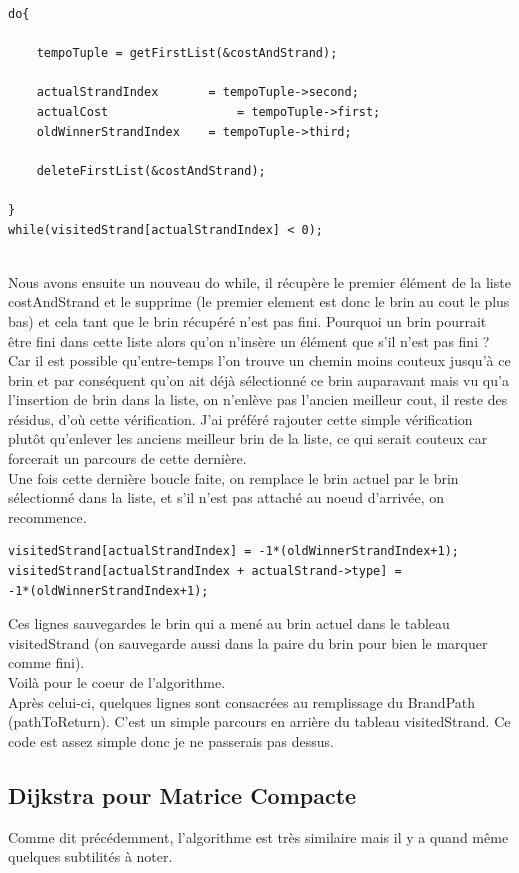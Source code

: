 \documentclass[11pt]{article}
\begin{document}
\begin{lstlisting}
do{

    tempoTuple = getFirstList(&costAndStrand);
    
    actualStrandIndex 		= tempoTuple->second;
    actualCost                  = tempoTuple->first;
    oldWinnerStrandIndex 	= tempoTuple->third;
    
    deleteFirstList(&costAndStrand);

}
while(visitedStrand[actualStrandIndex] < 0);
\end{lstlisting}\\
Nous avons ensuite un nouveau do while, il récupère le premier élément de la liste costAndStrand et le supprime (le premier element est donc le brin au cout le plus bas) et cela tant que le brin récupéré n'est pas fini. Pourquoi un brin pourrait être fini dans cette liste alors qu'on n'insère un élément que s'il n'est pas fini ? Car il est possible qu'entre-temps l'on trouve un chemin moins couteux jusqu'à ce brin et par conséquent qu'on ait déjà sélectionné ce brin auparavant mais vu qu'a l'insertion de brin dans la liste, on n'enlève pas l'ancien meilleur cout, il reste des résidus, d'où cette vérification. J'ai préféré rajouter cette simple vérification plutôt qu'enlever les anciens meilleur brin de la liste, ce qui serait couteux car forcerait un parcours de cette dernière.\newline
\\
Une fois cette dernière boucle faite, on remplace le brin actuel par le brin sélectionné dans la liste, et s'il n'est pas attaché au noeud d'arrivée, on recommence.\\


\begin{lstlisting}
visitedStrand[actualStrandIndex] = -1*(oldWinnerStrandIndex+1);
visitedStrand[actualStrandIndex + actualStrand->type] =
-1*(oldWinnerStrandIndex+1);
\end{lstlisting}

Ces lignes sauvegardes le brin qui a mené au brin actuel dans le tableau visitedStrand (on sauvegarde aussi dans la paire du brin pour bien le marquer comme fini).\\
Voilà pour le coeur de l'algorithme.\\
Après celui-ci, quelques lignes sont consacrées au remplissage du BrandPath (pathToReturn). C'est un simple parcours en arrière du tableau visitedStrand. Ce code est assez simple donc je ne passerais pas dessus.\\
\subsection{Dijkstra pour Matrice Compacte}
Comme dit précédemment, l'algorithme est très similaire mais il y a quand même quelques subtilités à noter.
\end{document}

